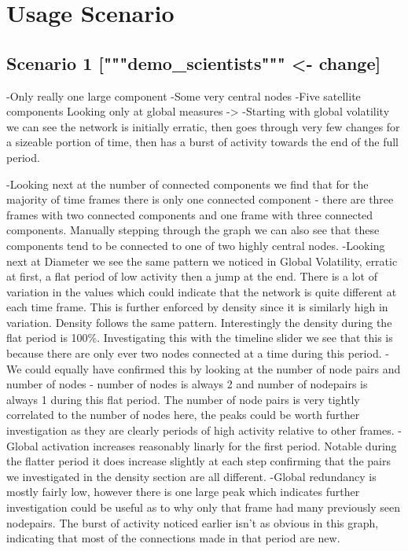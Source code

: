 
\chapter{Usage Scenario}

\section{Scenario 1 ["""demo_scientists""" <- change]}
-Only really one large component
-Some very central nodes
-Five satellite components
Looking only at global measures ->
    -Starting with global volatility we can see the network is initially erratic, then goes through very few changes for a sizeable portion of time, then has a burst of activity towards the end of the full period.
    
    -Looking next at the number of connected components we find that for the majority of time frames there is only one connected component - there are three frames with two connected components and one frame with three connected components. Manually stepping through the graph we can also see that these components tend to be connected to one of two highly central nodes.
    -Looking next at Diameter we see the same pattern we noticed in Global Volatility, erratic at first, a flat period of low activity then a jump at the end. There is a lot of variation in the values which could indicate that the network is quite different at each time frame. This is further enforced by density since it is similarly high in variation. Density follows the same pattern. Interestingly the density during the flat period is 100\%. Investigating this with the timeline slider we see that this is because there are only ever two nodes connected at a time during this period.
    -We could equally have confirmed this by looking at the number of node pairs and number of nodes - number of nodes is always 2 and number of nodepairs is always 1 during this flat period. The number of node pairs is very tightly correlated to the number of nodes here, the peaks could be worth further investigation as they are clearly periods of high activity relative to other frames.
    -Global activation increases reasonably linarly for the first period. Notable during the flatter period it does increase slightly at each step confirming that the pairs we investigated in the density section are all different. 
    -Global redundancy is mostly fairly low, however there is one large peak which indicates further investigation could be useful as to why only that frame had many previously seen nodepairs. The burst of activity noticed earlier isn't as obvious in this graph, indicating that most of the connections made in that period are new.
    
